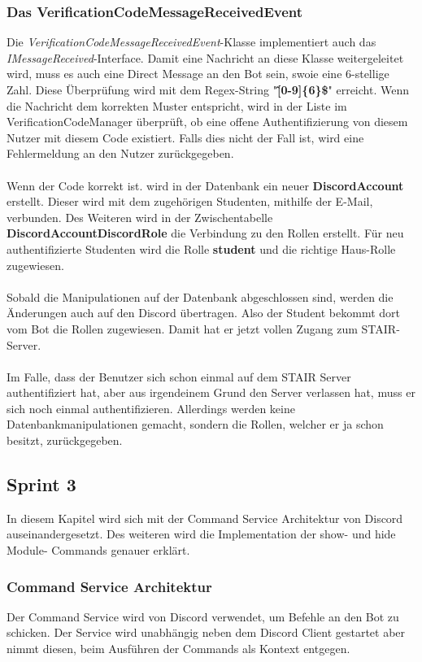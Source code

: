 \documentclass[a4paper, table]{article}
\begin{document}
\subsubsection*{Das VerificationCodeMessageReceivedEvent}
Die \textit{VerificationCodeMessageReceivedEvent}-Klasse implementiert auch das \textit{IMessageReceived}-Interface.
Damit eine Nachricht an diese Klasse weitergeleitet wird, muss es auch eine Direct Message an den Bot sein, 
swoie eine 6-stellige Zahl. 
Diese Überprüfung wird mit dem Regex-String "\textbf{\^[0-9]\{6\}\$}" erreicht.
Wenn die Nachricht dem korrekten Muster entspricht, wird in der Liste im VerificationCodeManager überprüft, 
ob eine offene Authentifizierung von diesem Nutzer mit diesem Code existiert.
Falls dies nicht der Fall ist, wird eine Fehlermeldung an den Nutzer zurückgegeben.\\\\
Wenn der Code korrekt ist. wird in der Datenbank ein neuer \textbf{DiscordAccount} erstellt.
Dieser wird mit dem zugehörigen Studenten, mithilfe der E-Mail, verbunden.
Des Weiteren wird in der Zwischentabelle \textbf{DiscordAccountDiscordRole} die Verbindung zu den Rollen erstellt.
Für neu authentifizierte Studenten wird die Rolle \textbf{student} und die richtige Haus-Rolle zugewiesen.\\\\
Sobald die Manipulationen auf der Datenbank abgeschlossen sind, werden die Änderungen auch auf den Discord übertragen.
Also der Student bekommt dort vom Bot die Rollen zugewiesen.
Damit hat er jetzt vollen Zugang zum STAIR-Server.\\\\
Im Falle, dass der Benutzer sich schon einmal auf dem STAIR Server authentifiziert hat, 
aber aus irgendeinem Grund den Server verlassen hat, muss er sich noch einmal authentifizieren.
Allerdings werden keine Datenbankmanipulationen gemacht, sondern die Rollen, welcher er ja schon besitzt, zurückgegeben.

\newpage
\subsection{Sprint 3}
In diesem Kapitel wird sich mit der Command Service Architektur von Discord auseinandergesetzt.
Des weiteren wird die Implementation der show- und hide Module- Commands genauer erklärt.

\subsubsection{Command Service Architektur}
Der Command Service wird von Discord verwendet, um Befehle an den Bot zu schicken.
Der Service wird unabhängig neben dem Discord Client gestartet aber nimmt diesen, beim Ausführen der Commands als Kontext entgegen.
\end{document}
